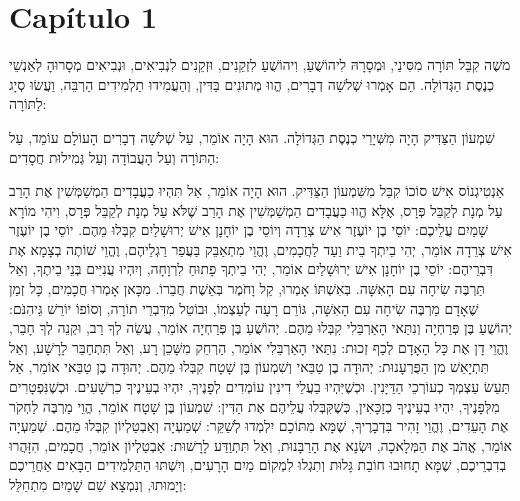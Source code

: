 

\chapter{Capítulo 1}

משֶׁה קִבֵּל תּוֹרָה מִסִּינַי, וּמְסָרָהּ לִיהוֹשֻׁעַ, וִיהוֹשֻׁעַ לִזְקֵנִים, וּזְקֵנִים לִנְבִיאִים, וּנְבִיאִים מְסָרוּהָ לְאַנְשֵׁי כְנֶסֶת הַגְּדוֹלָה. הֵם אָמְרוּ שְׁלשָׁה דְבָרִים, הֱווּ מְתוּנִים בַּדִּין, וְהַעֲמִידוּ תַלְמִידִים הַרְבֵּה, וַעֲשׂוּ סְיָג לַתּוֹרָה:

שִׁמְעוֹן הַצַּדִּיק הָיָה מִשְּׁיָרֵי כְנֶסֶת הַגְּדוֹלָה. הוּא הָיָה אוֹמֵר, עַל שְׁלשָׁה דְבָרִים הָעוֹלָם עוֹמֵד, עַל הַתּוֹרָה וְעַל הָעֲבוֹדָה וְעַל גְּמִילוּת חֲסָדִים:

אַנְטִיגְנוֹס אִישׁ סוֹכוֹ קִבֵּל מִשִּׁמְעוֹן הַצַּדִּיק. הוּא הָיָה אוֹמֵר, אַל תִּהְיוּ כַעֲבָדִים הַמְשַׁמְּשִׁין אֶת הָרַב עַל מְנָת לְקַבֵּל פְּרָס, אֶלָּא הֱווּ כַעֲבָדִים הַמְשַׁמְּשִׁין אֶת הָרַב שֶׁלֹּא עַל מְנָת לְקַבֵּל פְּרָס, וִיהִי מוֹרָא שָׁמַיִם עֲלֵיכֶם:
יוֹסֵי בֶן יוֹעֶזֶר אִישׁ צְרֵדָה וְיוֹסֵי בֶן יוֹחָנָן אִישׁ יְרוּשָׁלַיִם קִבְּלוּ מֵהֶם. יוֹסֵי בֶן יוֹעֶזֶר אִישׁ צְרֵדָה אוֹמֵר, יְהִי בֵיתְךָ בֵית וַעַד לַחֲכָמִים, וֶהֱוֵי מִתְאַבֵּק בַּעֲפַר רַגְלֵיהֶם, וֶהֱוֵי שׁוֹתֶה בְצָמָא אֶת דִּבְרֵיהֶם:
יוֹסֵי בֶן יוֹחָנָן אִישׁ יְרוּשָׁלַיִם אוֹמֵר, יְהִי בֵיתְךָ פָתוּחַ לִרְוָחָה, וְיִהְיוּ עֲנִיִּים בְּנֵי בֵיתֶךָ, וְאַל תַּרְבֶּה שִׂיחָה עִם הָאִשָּׁה. בְּאִשְׁתּוֹ אָמְרוּ, קַל וָחֹמֶר בְּאֵשֶׁת חֲבֵרוֹ. מִכָּאן אָמְרוּ חֲכָמִים, כָּל זְמַן שֶׁאָדָם מַרְבֶּה שִׂיחָה עִם הָאִשָּׁה, גּוֹרֵם רָעָה לְעַצְמוֹ, וּבוֹטֵל מִדִּבְרֵי תוֹרָה, וְסוֹפוֹ יוֹרֵשׁ גֵּיהִנֹּם:
יְהוֹשֻׁעַ בֶּן פְּרַחְיָה וְנִתַּאי הָאַרְבֵּלִי קִבְּלוּ מֵהֶם. יְהוֹשֻׁעַ בֶּן פְּרַחְיָה אוֹמֵר, עֲשֵׂה לְךָ רַב, וּקְנֵה לְךָ חָבֵר, וֶהֱוֵי דָן אֶת כָּל הָאָדָם לְכַף זְכוּת:
נִתַּאי הָאַרְבֵּלִי אוֹמֵר, הַרְחֵק מִשָּׁכֵן רָע, וְאַל תִּתְחַבֵּר לָרָשָׁע, וְאַל תִּתְיָאֵשׁ מִן הַפֻּרְעָנוּת:
יְהוּדָה בֶן טַבַּאי וְשִׁמְעוֹן בֶּן שָׁטָח קִבְּלוּ מֵהֶם. יְהוּדָה בֶן טַבַּאי אוֹמֵר, אַל תַּעַשׂ עַצְמְךָ כְעוֹרְכֵי הַדַּיָּנִין. וּכְשֶׁיִּהְיוּ בַעֲלֵי דִינִין עוֹמְדִים לְפָנֶיךָ, יִהְיוּ בְעֵינֶיךָ כִרְשָׁעִים. וּכְשֶׁנִּפְטָרִים מִלְּפָנֶיךָ, יִהְיוּ בְעֵינֶיךָ כְזַכָּאִין, כְּשֶׁקִּבְּלוּ עֲלֵיהֶם אֶת הַדִּין:
שִׁמְעוֹן בֶּן שָׁטָח אוֹמֵר, הֱוֵי מַרְבֶּה לַחְקֹר אֶת הָעֵדִים, וֶהֱוֵי זָהִיר בִּדְבָרֶיךָ, שֶׁמָּא מִתּוֹכָם יִלְמְדוּ לְשַׁקֵּר:
שְׁמַעְיָה וְאַבְטַלְיוֹן קִבְּלוּ מֵהֶם. שְׁמַעְיָה אוֹמֵר, אֱהֹב אֶת הַמְּלָאכָה, וּשְׂנָא אֶת הָרַבָּנוּת, וְאַל תִּתְוַדַּע לָרָשׁוּת:
אַבְטַלְיוֹן אוֹמֵר, חֲכָמִים, הִזָּהֲרוּ בְדִבְרֵיכֶם, שֶׁמָּא תָחוּבוּ חוֹבַת גָּלוּת וְתִגְלוּ לִמְקוֹם מַיִם הָרָעִים, וְיִשְׁתּוּ הַתַּלְמִידִים הַבָּאִים אַחֲרֵיכֶם וְיָמוּתוּ, וְנִמְצָא שֵׁם שָׁמַיִם מִתְחַלֵּל:
